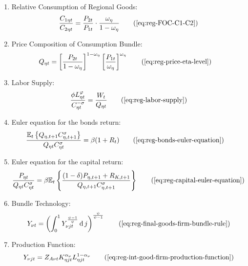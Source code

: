 \documentclass[
thesis.tex
]{subfiles}
\begin{document}
{\begin{itemize}
\begin{enumerate}

		\item Relative Consumption of Regional Goods:
		\begin{align}
			\frac{C_{1\eta t}}{C_{2\eta t}} = \frac{P_{2t}}{P_{1t}} \cdot \frac{\omega_{\eta}}{1 -\omega_{\eta}} \tag{\ref{eq:reg-FOC-C1-C2}}
		\end{align}


		\item Price Composition of Consumption Bundle:
		\begin{align}
			Q_{\eta t} &= \left[ \frac{P_{2t}}{1 -\omega_{\eta}} \right]^{1 -\omega_{\eta}} \left[ \frac{P_{1t}}{\omega_{\eta}} \right]^{\omega_{\eta}} \tag{\ref{eq:reg-price-eta-level}}
		\end{align}

		\item Labor Supply:
		\begin{align}
			\frac{\phi L_{\eta t}^{\varphi}}{C_{\eta t}^{-\sigma}} = \frac{W_t}{Q_{\eta t}} \tag{\ref{eq:reg-labor-supply}}
		\end{align}

		\item Euler equation for the bonds return:
		\begin{align}
			\frac{ \E \left\{ Q_{\eta, t+1} C_{\eta, t+1}^{\sigma} \right\} }{ Q_{\eta t} C_{\eta t}^{\sigma} } &= \beta (1 + R_{t}) \tag{\ref{eq:reg-bonds-euler-equation}}
		\end{align}
		
		\item Euler equation for the capital return:
		\begin{align}
			\frac{ P_{\eta t} }{ Q_{\eta t} C_{\eta t}^{\sigma} }  &= \beta \mathbb{E}_t \left\{ \frac{ (1-\delta) P_{\eta, t+1} + R_{K,t+1} }{ Q_{\eta, t+1} C_{\eta, t+1}^{\sigma} } \right\} \tag{\ref{eq:reg-capital-euler-equation}}
		\end{align}
					
		\item Bundle Technology:
		\begin{align}
			Y_{\nu t} = \left( \int_{0}^{1} Y_{\nu jt}^{\frac{\psi-1}{\psi}} \dif j \right)^{\frac{\psi}{\psi-1}} \tag{\ref{eq:reg-final-goods-firm-bundle-rule}}
		\end{align}
			
		\item Production Function:
		\begin{align}
			Y_{\nu jt} = Z_{A\nu t} K_{\eta jt}^{\alpha_\nu} L_{\eta jt}^{1-{\alpha_\nu}} \tag{\ref{eq:reg-int-good-firm-production-function}}
		\end{align}


\end{enumerate}
\end{itemize}}
\end{document}

